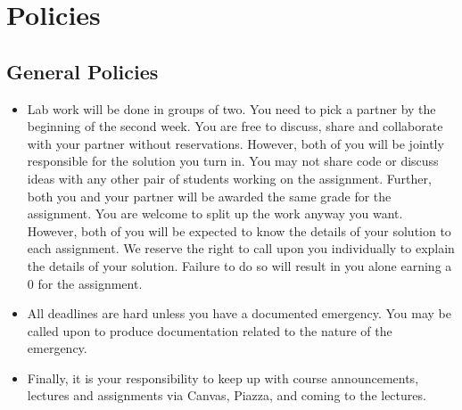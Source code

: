 \documentclass [11pt]{article}
\begin{document}
 


\section*{Policies}

\subsection*{General Policies}

\begin{itemize}

\item Lab work will be done in groups of two. You need to pick a partner by the beginning of the second week. You are free to discuss, share and collaborate with your partner without reservations. However, both of you will be jointly responsible for the solution you turn in. You may not share code or discuss ideas with any other pair of students working on the assignment. Further, both you and your partner will be awarded the same grade for the assignment. You are welcome to split up the work anyway you want. However, both of you will be expected to know the details of your solution to each assignment. We reserve the right to call upon you individually to explain the details of your solution. Failure to do so will result in you alone earning a 0 for the assignment.


\item All deadlines are hard unless you have a documented emergency. You may be called upon to produce documentation related to the nature of the emergency.


\item Finally, it is your responsibility to keep up with course announcements, lectures and assignments via Canvas, Piazza, and coming to the lectures. 

\end{itemize}
\end{document}
